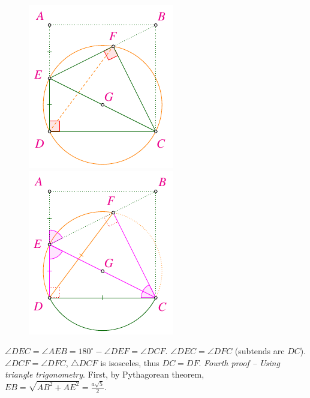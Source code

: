 \begin{multicols}{2}
	\begin{figure}[H]
		\vspace*{-15pt}
		\centering
		\captionsetup{labelformat= empty, justification=centering}
		\includegraphics[width= 0.65\linewidth]{2022-2-ms-1-1-f.pdf}
		\captionsetup{labelformat= empty, justification=centering}
		\includegraphics[width= 0.65\linewidth]{2022-2-ms-1-1-g.pdf}
		\vspace*{-5pt}
	\end{figure}	
	$\angle DEC = \angle AEB = 180^{\circ} - \angle DEF = \angle DCF.$ 
	$\angle DEC = \angle DFC$ (subtends arc $DC$).
	$\angle DCF = \angle DFC$, $\triangle DCF$ is isosceles, thus $DC = DF.$
	\vskip 0.1cm
	\textit{Fourth proof -- Using triangle trigonometry}.
	First, by Pythagorean theorem, $EB = \sqrt{AB^2 +AE^2} = \frac{a\sqrt{5}}{2}.$

\end{multicols}
